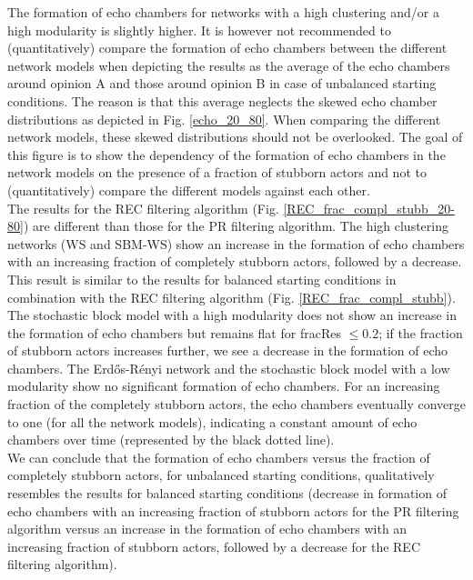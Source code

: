 \documentclass[11 pt , letterpaper , twoside , openright]{book}
\begin{document}
\newline
The formation of echo chambers for networks with a high clustering and/or a high modularity is slightly higher. It is however not recommended to (quantitatively) compare the formation of echo chambers between the different network models when depicting the results as the average of the echo chambers around opinion A and those around opinion B in case of unbalanced starting conditions. The reason is that this average neglects the skewed echo chamber distributions as depicted in Fig. \ref{echo_20_80}. When comparing the different network models, these skewed distributions should not be overlooked. The goal of this figure is to show the dependency of the formation of echo chambers in the network models on the presence of a fraction of stubborn actors and not to (quantitatively) compare the different models against each other. \\
\newline
The results for the REC filtering algorithm (Fig. \ref{REC_frac_compl_stubb_20-80}) are different than those for the PR filtering algorithm. The high clustering networks (WS and SBM-WS) show an increase in the formation of echo chambers with an increasing fraction of completely stubborn actors, followed by a decrease. This result is similar to the results for balanced starting conditions in combination with the REC filtering algorithm (Fig. \ref{REC_frac_compl_stubb}). The stochastic block model with a high modularity does not show an increase in the formation of echo chambers but remains flat for fracRes $\leqslant 0.2$; if the fraction of stubborn actors increases further, we see a decrease in the formation of echo chambers. The Erd\H{o}s-R\'{e}nyi network and the stochastic block model with a low modularity show no significant formation of echo chambers. For an increasing fraction of the completely stubborn actors, the echo chambers eventually converge to one (for all the network models), indicating a constant amount of echo chambers over time (represented by the black dotted line).\\
\newline
We can conclude that the formation of echo chambers versus the fraction of completely stubborn actors, for unbalanced starting conditions, qualitatively resembles the results for balanced starting conditions (decrease in formation of echo chambers with an increasing fraction of stubborn actors for the PR filtering algorithm versus an increase in the formation of echo chambers with an increasing fraction of stubborn actors, followed by a decrease for the REC filtering algorithm). 
\end{document}
